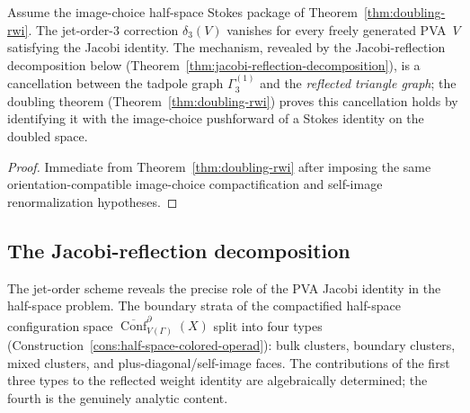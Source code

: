 \begin{corollary}
\label{cor:cubic-rwi}
Assume the image-choice half-space Stokes package of Theorem~\ref{thm:doubling-rwi}. The jet-order-$3$
correction $\delta_3(V)$ vanishes for every
freely generated PVA~$V$ satisfying the Jacobi identity. The
mechanism, revealed by the Jacobi-reflection decomposition below
(Theorem~\ref{thm:jacobi-reflection-decomposition}), is a cancellation
between the tadpole graph $\Gamma_3^{(1)}$ and the \emph{reflected
triangle graph}; the doubling theorem
(Theorem~\ref{thm:doubling-rwi}) proves this cancellation holds by
identifying it with the image-choice pushforward of a Stokes identity
on the doubled space.
\end{corollary}

\begin{proof}
Immediate from Theorem~\ref{thm:doubling-rwi} after imposing the same
orientation-compatible image-choice compactification and self-image
renormalization hypotheses.
\end{proof}

\subsection{The Jacobi-reflection decomposition}

The jet-order scheme reveals the precise role of the PVA Jacobi
identity in the half-space problem. The boundary strata of the
compactified half-space configuration space
$\overline{\operatorname{Conf}}^{\partial}_{V(\Gamma)}(X)$
split into four types
(Construction~\ref{cons:half-space-colored-operad}): bulk clusters,
boundary clusters, mixed clusters, and plus-diagonal/self-image faces. The
contributions of the first three types to the reflected weight identity
are algebraically determined; the fourth is the genuinely analytic
content.

